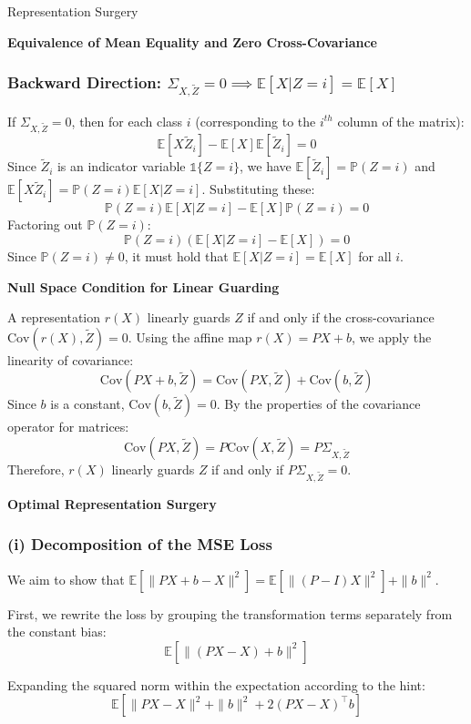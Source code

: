 \begin{question}{Representation Surgery}
\begin{subquestion}{\textbf{Equivalence of Mean Equality and Zero Cross-Covariance}}
\subsubsection*{Backward Direction: $\Sigma_{X,\tilde{Z}} = 0 \implies \mathbb{E}[X|Z=i] = \mathbb{E}[X]$}
If $\Sigma_{X,\tilde{Z}} = 0$, then for each class $i$ (corresponding to the $i^{th}$ column of the matrix):
$$\mathbb{E}[X\tilde{Z}_i] - \mathbb{E}[X]\mathbb{E}[\tilde{Z}_i] = 0$$
Since $\tilde{Z}_i$ is an indicator variable $\mathbb{1}\{Z=i\}$, we have $\mathbb{E}[\tilde{Z}_i] = \mathbb{P}(Z=i)$ and $\mathbb{E}[X\tilde{Z}_i] = \mathbb{P}(Z=i)\mathbb{E}[X|Z=i]$. Substituting these:
$$\mathbb{P}(Z=i)\mathbb{E}[X|Z=i] - \mathbb{E}[X]\mathbb{P}(Z=i) = 0$$
Factoring out $\mathbb{P}(Z=i)$:
$$\mathbb{P}(Z=i) \left( \mathbb{E}[X|Z=i] - \mathbb{E}[X] \right) = 0$$
Since $\mathbb{P}(Z=i) \neq 0$, it must hold that $\mathbb{E}[X|Z=i] = \mathbb{E}[X]$ for all $i$.
\end{subquestion}

\begin{subquestion}{\textbf{Null Space Condition for Linear Guarding}}

A representation $r(X)$ linearly guards $Z$ if and only if the cross-covariance $\text{Cov}(r(X), \tilde{Z}) = 0$. Using the affine map $r(X) = PX + b$, we apply the linearity of covariance:
$$\text{Cov}(PX + b, \tilde{Z}) = \text{Cov}(PX, \tilde{Z}) + \text{Cov}(b, \tilde{Z})$$
Since $b$ is a constant, $\text{Cov}(b, \tilde{Z}) = 0$. By the properties of the covariance operator for matrices:
$$\text{Cov}(PX, \tilde{Z}) = P \text{Cov}(X, \tilde{Z}) = P \Sigma_{X,\tilde{Z}}$$
Therefore, $r(X)$ linearly guards $Z$ if and only if $P \Sigma_{X,\tilde{Z}} = 0$.
\end{subquestion}

\begin{subquestion}{\textbf{Optimal Representation Surgery}}

\subsubsection*{(i) Decomposition of the MSE Loss}
We aim to show that $\mathbb{E}[\|PX + b - X\|^2] = \mathbb{E}[\|(P-I)X\|^2] + \|b\|^2$.

First, we rewrite the loss by grouping the transformation terms separately from the constant bias:
$$\mathbb{E}[\|(PX - X) + b\|^2]$$

Expanding the squared norm within the expectation according to the hint:
$$\mathbb{E}[\|PX - X\|^2 + \|b\|^2 + 2(PX - X)^\top b]$$


\end{subquestion}
\end{question}
